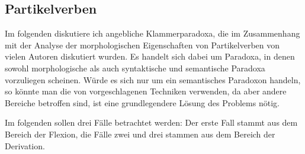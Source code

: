 \subsection{Partikelverben}
\label{morph-pv}

Im folgenden diskutiere ich angebliche Klammerparadoxa, die im Zusammenhang mit der Analyse der
morphologischen Eigenschaften von Partikelverben von vielen Autoren diskutiert wurden. Es handelt sich
dabei um Paradoxa, in denen sowohl morphologische als auch syntaktische und semantische Paradoxa vorzuliegen
scheinen. Würde es sich nur um ein semantisches Paradoxon handeln, so könnte man die von \citet{Egg2004a}
vorgeschlagenen Techniken verwenden, da aber andere Bereiche betroffen sind, ist eine grundlegendere Lösung
des Problems nötig.

Im folgenden sollen drei Fälle betrachtet werden: Der erste Fall stammt aus dem Bereich der
Flexion, die Fälle zwei und drei stammen aus dem Bereich der Derivation.

